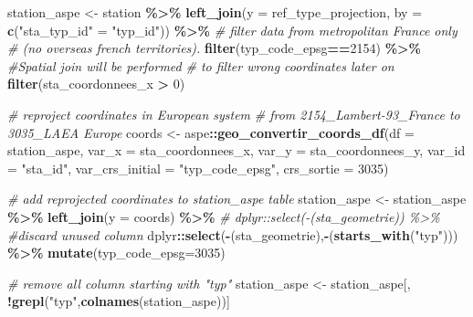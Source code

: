 \documentclass[]{template/RapportPole}
\newenvironment{Shaded}{\begin{snugshade}}{\end{snugshade}}
\newcommand{\AttributeTok}[1]{\textcolor[rgb]{0.13,0.29,0.53}{#1}}
\newcommand{\CommentTok}[1]{\textcolor[rgb]{0.56,0.35,0.01}{\textit{#1}}}
\newcommand{\DecValTok}[1]{\textcolor[rgb]{0.00,0.00,0.81}{#1}}
\newcommand{\FunctionTok}[1]{\textcolor[rgb]{0.13,0.29,0.53}{\textbf{#1}}}
\newcommand{\NormalTok}[1]{#1}
\newcommand{\OtherTok}[1]{\textcolor[rgb]{0.56,0.35,0.01}{#1}}
\newcommand{\SpecialCharTok}[1]{\textcolor[rgb]{0.81,0.36,0.00}{\textbf{#1}}}
\newcommand{\StringTok}[1]{\textcolor[rgb]{0.31,0.60,0.02}{#1}}
\begin{document}
\begin{Shaded}
\begin{Highlighting}[]
\NormalTok{station\_aspe }\OtherTok{\textless{}{-}}\NormalTok{ station }\SpecialCharTok{\%\textgreater{}\%}
        \FunctionTok{left\_join}\NormalTok{(}\AttributeTok{y =}\NormalTok{ ref\_type\_projection, }
                  \AttributeTok{by =} \FunctionTok{c}\NormalTok{(}\StringTok{"sta\_typ\_id"} \OtherTok{=} \StringTok{"typ\_id"}\NormalTok{)) }\SpecialCharTok{\%\textgreater{}\%}
    \CommentTok{\# filter data from metropolitan France only }
    \CommentTok{\# (no overseas french territories). }
        \FunctionTok{filter}\NormalTok{(typ\_code\_epsg}\SpecialCharTok{==}\DecValTok{2154}\NormalTok{) }\SpecialCharTok{\%\textgreater{}\%}  
    \CommentTok{\#Spatial join will be performed }
    \CommentTok{\# to filter wrong coordinates later on}
        \FunctionTok{filter}\NormalTok{(sta\_coordonnees\_x }\SpecialCharTok{\textgreater{}} \DecValTok{0}\NormalTok{)}

\CommentTok{\# reproject coordinates in European system}
\CommentTok{\# from 2154\_Lambert{-}93\_France to 3035\_LAEA Europe}
\NormalTok{coords }\OtherTok{\textless{}{-}}\NormalTok{ aspe}\SpecialCharTok{::}\FunctionTok{geo\_convertir\_coords\_df}\NormalTok{(}\AttributeTok{df =}\NormalTok{ station\_aspe,}
        \AttributeTok{var\_x =}\NormalTok{ sta\_coordonnees\_x,}
        \AttributeTok{var\_y =}\NormalTok{ sta\_coordonnees\_y,}
        \AttributeTok{var\_id =} \StringTok{"sta\_id"}\NormalTok{,}
        \AttributeTok{var\_crs\_initial =} \StringTok{"typ\_code\_epsg"}\NormalTok{,}
        \AttributeTok{crs\_sortie =} \DecValTok{3035}\NormalTok{) }

\CommentTok{\# add reprojected coordinates to station\_aspe table}
\NormalTok{station\_aspe }\OtherTok{\textless{}{-}}\NormalTok{ station\_aspe }\SpecialCharTok{\%\textgreater{}\%}
        \FunctionTok{left\_join}\NormalTok{(}\AttributeTok{y =}\NormalTok{ coords) }\SpecialCharTok{\%\textgreater{}\%} 
    \CommentTok{\# dplyr::select({-}(sta\_geometrie)) \%\textgreater{}\%}
    \CommentTok{\#discard unused column}
\NormalTok{        dplyr}\SpecialCharTok{::}\FunctionTok{select}\NormalTok{(}\SpecialCharTok{{-}}\NormalTok{(sta\_geometrie),}\SpecialCharTok{{-}}\NormalTok{(}\FunctionTok{starts\_with}\NormalTok{(}\StringTok{"typ"}\NormalTok{))) }\SpecialCharTok{\%\textgreater{}\%} 
        \FunctionTok{mutate}\NormalTok{(}\AttributeTok{typ\_code\_epsg=}\DecValTok{3035}\NormalTok{) }

\CommentTok{\# remove all column starting with "typ"}
\NormalTok{station\_aspe }\OtherTok{\textless{}{-}}\NormalTok{ station\_aspe[,  }\SpecialCharTok{!}\FunctionTok{grepl}\NormalTok{(}\StringTok{"typ"}\NormalTok{,}\FunctionTok{colnames}\NormalTok{(station\_aspe))] }
\end{Highlighting}
\end{Shaded}
\end{document}
